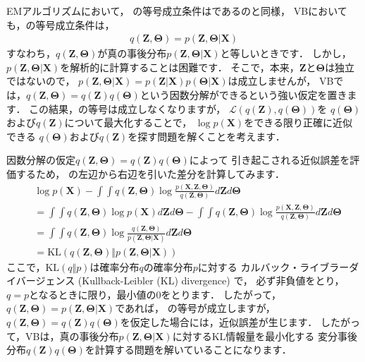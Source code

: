 EMアルゴリズムにおいて，
の等号成立条件はであるのと同様，
VBにおいても，の等号成立条件は，
\begin{align}
 q(\bm{Z},\bm\Theta) = p(\bm{Z},\bm\Theta|\bm{X})
 \label{eq:vb_equality_condition}
\end{align}
すなわち，$q(\bm{Z},\bm\Theta)$が真の事後分布$p(\bm{Z},\bm\Theta|\bm{X})$と等しいときです．
しかし，$p(\bm{Z},\bm\Theta|\bm{X})$を解析的に計算することは困難です．
そこで，本来，$\bm{Z}$と$\bm\Theta$は独立ではないので，
$p(\bm{Z},\bm\Theta|\bm{X}) = p(\bm{Z}|\bm{X}) p(\bm\Theta|\bm{X})$は成立しませんが，
VBでは，$q(\bm{Z},\bm\Theta) = q(\bm{Z})q(\bm\Theta)$という因数分解ができるという強い仮定を置きます．
この結果，の等号は成立しなくなりますが，
$\mathcal{L}(q(\bm{Z}),q(\bm\Theta))$を
$q(\bm\Theta)$および$q(\bm{Z})$について最大化することで，
$\log p(\bm{X})$をできる限り正確に近似できる
$q(\bm\Theta)$および$q(\bm{Z})$を探す問題を解くことを考えます．

因数分解の仮定$q(\bm{Z},\bm\Theta) = q(\bm{Z})q(\bm\Theta)$によって
引き起こされる近似誤差を評価するため，
の左辺から右辺を引いた差分を計算してみます．
\begin{align}
&\log p(\bm{X})
-
\int\int q(\bm{Z},\bm\Theta)
 \log \frac{p(\bm{X},\bm{Z},\bm\Theta)}{q(\bm{Z},\bm\Theta)} d\bm{Z}d\bm\Theta
\nonumber\\
&=
\int\int q(\bm{Z},\bm\Theta) \log p(\bm{X}) d\bm{Z}d\bm\Theta
-
\int\int q(\bm{Z},\bm\Theta)
 \log \frac{p(\bm{X},\bm{Z},\bm\Theta)}{q(\bm{Z},\bm\Theta)} d\bm{Z}d\bm\Theta
\nonumber\\
&=
\int\int q(\bm{Z},\bm\Theta)
 \log \frac{q(\bm{Z},\bm\Theta)}{p(\bm{Z},\bm\Theta|\bm{X})} d\bm{Z}d\bm\Theta
\nonumber\\
&=
\mbox{KL}(q(\bm{Z},\bm\Theta) \Vert p(\bm{Z},\bm\Theta|\bm{X}))
\end{align}
ここで，$\mbox{KL}(q \Vert p)$は確率分布$q$の確率分布$p$に対する
カルバック・ライブラーダイバージェンス (Kullback-Leibler (KL) divergence) で，
必ず非負値をとり，$q=p$となるときに限り，最小値の0をとります．
したがって，$q(\bm{Z},\bm\Theta) = p(\bm{Z},\bm\Theta|\bm{X})$であれば，
の等号が成立しますが，
$q(\bm{Z},\bm\Theta) = q(\bm{Z})q(\bm\Theta)$を仮定した場合には，近似誤差が生じます．
したがって，VBは，真の事後分布$p(\bm{Z},\bm\Theta|\bm{X})$に対するKL情報量を最小化する
変分事後分布$q(\bm{Z})q(\bm\Theta)$を計算する問題を解いていることになります．


